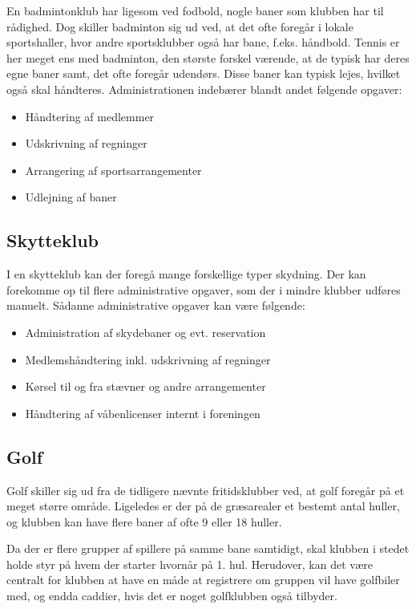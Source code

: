 En badmintonklub har ligesom ved fodbold, nogle baner som klubben har til rådighed. Dog skiller badminton sig
ud ved, at det ofte foregår i lokale sportshaller, hvor andre sportsklubber også har bane, f.eks. håndbold.
Tennis er her meget ens med badminton, den største forskel værende, at de typisk har deres egne baner samt,
det ofte foregår udendørs. Disse baner kan typisk lejes, hvilket også skal håndteres. Administrationen
indebærer blandt andet følgende opgaver:

\begin{itemize}
  \item Håndtering af medlemmer
  \item Udskrivning af regninger
  \item Arrangering af sportsarrangementer
  \item Udlejning af baner
\end{itemize}


\subsection{Skytteklub}

I en skytteklub kan der foregå mange forskellige typer skydning. Der kan forekomme op til flere administrative
opgaver, som der i mindre klubber udføres manuelt. Sådanne administrative opgaver kan være følgende:

\begin{itemize}
  \item Administration af skydebaner og evt. reservation
  \item Medlemshåndtering inkl. udskrivning af regninger
  \item Kørsel til og fra stævner og andre arrangementer
  \item Håndtering af våbenlicenser internt i foreningen
\end{itemize}


\subsection{Golf}

Golf skiller sig ud fra de tidligere nævnte fritidsklubber ved, at golf foregår på et meget større område.
Ligeledes er der på de græsarealer et bestemt antal huller, og klubben kan have flere baner af ofte 9 eller 18
huller.

Da der er flere grupper af spillere på samme bane samtidigt, skal klubben i stedet holde styr på hvem der
starter hvornår på 1. hul. Herudover, kan det være centralt for klubben at have en måde at
registrere om gruppen vil have golfbiler med, og endda caddier, hvis det er noget golfklubben også tilbyder.

